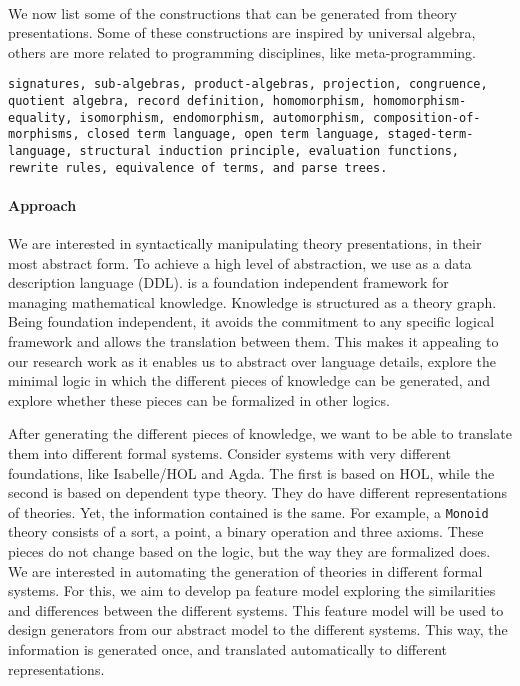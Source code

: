 \documentclass[orivec]{llncs}
\begin{document}
\paragraph{} 
We now list some of the constructions that can be generated from theory presentations. Some of 
these constructions are inspired by universal algebra, others are more related to programming 
disciplines, like meta-programming. 
\begin{lstlisting}
signatures, sub-algebras, product-algebras, projection, congruence, 
quotient algebra, record definition, homomorphism, homomorphism- 
equality, isomorphism, endomorphism, automorphism, composition-of-
morphisms, closed term language, open term language, staged-term-
language, structural induction principle, evaluation functions, 
rewrite rules, equivalence of terms, and parse trees. 
\end{lstlisting}


\paragraph{Approach}
We are interested in syntactically manipulating theory presentations, in their most abstract form. To 
achieve a high level of abstraction, we use \mmt \cite{kohlhase2010towards} as a data description 
language (DDL). 
\mmt is a foundation independent framework for managing mathematical knowledge. Knowledge is 
structured as a theory graph. 
Being foundation independent, it avoids the commitment to any specific logical framework and allows 
the translation between them. This makes it appealing to our research work as it enables us to abstract 
over language details, explore the minimal logic in which the different pieces of knowledge can be 
generated, and explore whether these pieces can be formalized in other logics. 

After generating the different pieces of knowledge, we want to be able to translate them into different 
formal systems. Consider systems with very different foundations, like Isabelle/HOL and Agda. The first 
is based on HOL, while the second is based on dependent type theory. They do have different 
representations of theories. Yet, the information contained is the same. For example, a \verb|Monoid| 
theory consists of a sort, a point, a binary operation and three axioms. These pieces do not change 
based on the logic, but the way they are formalized does. We are interested in automating the 
generation of theories in different formal systems. For this, we aim to develop pa feature model 
exploring the similarities and differences between the different systems. This feature model will be used 
to design generators from our abstract model to the different systems. This way, the 
information is generated once, and translated automatically to different representations. 
\end{document}
